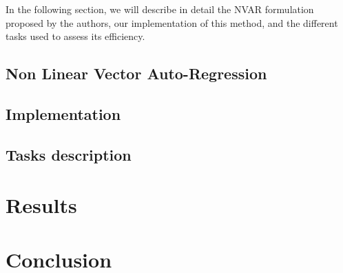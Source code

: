 In the following section, we will describe in detail the NVAR formulation proposed by the authors, our implementation
of this method, and the different tasks used to assess its efficiency.


\subsection{Non Linear Vector Auto-Regression}

\subsection{Implementation}

\subsection{Tasks description}

\section{Results}

\section{Conclusion}

